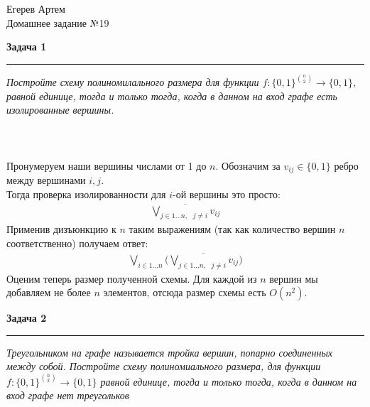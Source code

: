 \documentclass[11pt,a4paper]{scrartcl}
\begin{document}
\begin{flushright}
	Егерев Артем \\
	Домашнее задание №19\\
\end{flushright}
\textbf{\Large Задача 1}
\medskip\hrule\medskip
\textsl{Постройте схему полиномилального размера для функции $ f: \{0, 1\}^{\binom{n}{2}} \rightarrow \{0, 1\}$, равной единице, тогда и только тогда, когда в данном на вход графе есть изолированные вершины.} \\ \\
 \\ \\

\noindent Пронумеруем наши вершины числами от 1 до $ n $. Обозначим за $ v_{ij} \in \{0, 1\} $ ребро между вершинами $i, j$. \\
Тогда проверка изолированности для $ i $-ой вершины это просто:
\begin{gather*}
	\overline{\bigvee_{j \in 1 ... n, \text{ }j \neq i } v_{ij}}
\end{gather*}   
\noindent Применив дизъюнкцию к  $ n $ таким выражениям (так как количество вершин $ n $ соответственно) получаем ответ:
\begin{gather*}
	\bigvee_{i \in 1... n} \big ( \overline{\bigvee_{j \in 1 ... n, \text{ }j \neq i } v_{ij}} \big )
\end{gather*}
Оценим теперь размер полученной схемы. Для каждой из $ n $ вершин мы добавляем не более $ n $ элементов, отсюда размер схемы есть $ O(n^2) $.
\newpage








\textbf{\Large Задача 2}
\medskip\hrule\medskip
\textsl{Треугольником на графе называется тройка вершин, попарно соединенных между собой. Постройте схему полиномиального размера, для функции $ f: \{0, 1\}^{\binom{n}{2}} \rightarrow \{0, 1\}$ равной единице, тогда и только тогда, когда в данном на вход графе нет треугольков} \\ \\
 \\ \\
\end{document}
